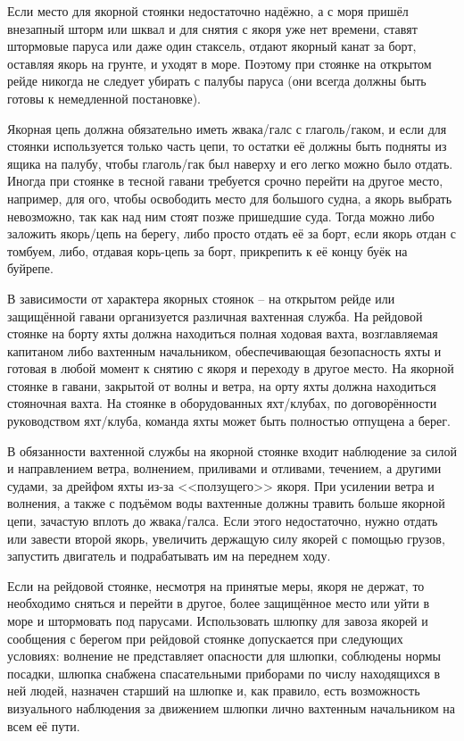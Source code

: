 Если место для якорной стоянки недостаточно надёжно, а с моря пришёл внезапный шторм или шквал и для снятия с якоря уже нет времени, ставят штормовые паруса или даже один стаксель, отдают якорный канат за борт, оставляя якорь на грунте, и уходят в море. Поэтому при стоянке на открытом рейде никогда не следует убирать с палубы паруса (они всегда должны быть готовы к немедленной постановке).

Якорная цепь должна обязательно иметь жвака\-/галс с глаголь\-/гаком, и если для стоянки используется только часть цепи, то остатки её должны быть подняты из ящика на палубу, чтобы глаголь\-/гак был наверху и его легко можно было отдать. Иногда при стоянке в тесной гавани требуется срочно перейти на другое место, например, для ого, чтобы освободить место для большого судна, а якорь выбрать невозможно, так как над ним стоят позже пришедшие суда. Тогда можно либо заложить якорь\-/цепь на берегу, либо просто отдать её за борт, если якорь отдан с томбуем, либо, отдавая корь-цепь за борт, прикрепить к её концу буёк на буйрепе. 

В зависимости от характера якорных стоянок \--- на открытом рейде или защищённой гавани организуется различная вахтенная служба. На рейдовой стоянке на борту яхты должна находиться полная ходовая вахта, возглавляемая капитаном либо вахтенным начальником, обеспечивающая безопасность яхты и готовая в любой момент к снятию с якоря и переходу в другое место. На якорной стоянке в гавани, закрытой от волны и ветра, на орту яхты должна находиться стояночная вахта. На стоянке в оборудованных яхт\-/клубах, по договорённости руководством яхт\-/клуба, команда яхты может быть полностью отпущена а берег.

В обязанности вахтенной службы на якорной стоянке входит наблюдение за силой и направлением ветра, волнением, приливами и отливами, течением, а другими судами, за дрейфом яхты из-за <<ползущего>> якоря. При усилении ветра и волнения, а также с подъёмом воды вахтенные должны травить больше якорной цепи, зачастую вплоть до жвака\-/галса. Если этого недостаточно, нужно отдать или завести второй якорь, увеличить держащую силу якорей с помощью грузов, запустить двигатель и подрабатывать им на переднем ходу.

Если на рейдовой стоянке, несмотря на принятые меры, якоря не держат, то необходимо сняться и перейти в другое, более защищённое место или уйти в море и штормовать под парусами. Использовать шлюпку для завоза якорей и сообщения с берегом при рейдовой стоянке допускается при следующих условиях: волнение не представляет опасности для шлюпки, соблюдены нормы посадки, шлюпка снабжена спасательными приборами по числу находящихся в ней людей, назначен старший на шлюпке и, как правило, есть возможность визуального наблюдения за движением шлюпки лично вахтенным начальником на всем её пути. 

